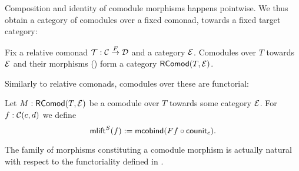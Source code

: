 \documentclass{amsart}
\begin{document}
Composition and identity of comodule morphisms happens pointwise. We thus obtain a category of comodules
over a fixed comonad, towards a fixed target category:

\begin{remark}
 Fix a relative comonad $\T : \C\stackrel{F}{\to}\D$ and a category $\E$.
 Comodules over $T$ towards $\E$ and their morphisms () form a category $\RComod(T,\E)$.
\end{remark}

Similarly to relative comonads, comodules over these are functorial:

\begin{definition}\label{def:comodule_lift}
 Let $M : \RComod(T,\E)$ be a comodule over $T$ towards some category $\E$. For $f : \C(c,d)$ we define
  \[ \mlift^S(f) := \mcobind(\comp{\counit_c}{Ff}) .  \]
\end{definition}


\begin{remark}
  The family of morphisms constituting a comodule morphism is actually natural with respect to the functoriality 
  defined in .
\end{remark}




\end{document}

